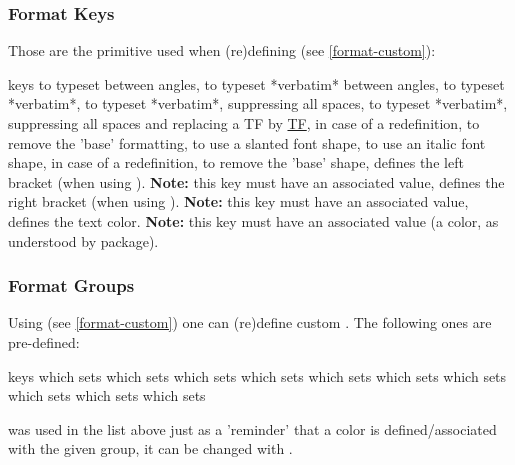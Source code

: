 \documentclass{article}
\begin{document}
\subsubsection{Format Keys}\label{format-keys}
Those are the primitive  used when (re)defining   (see \ref{format-custom}):
\begin{describelist*}{keys}
   {to typeset between angles,}
   {to typeset *verbatim* between angles,}
   {to typeset *verbatim*,}
   {to typeset *verbatim*, suppressing all spaces,}
   {to typeset *verbatim*, suppressing all spaces and replacing a TF by \underline{TF},}
   {in case of a redefinition, to remove the 'base' formatting,}
   {to use a slanted font shape,}
   {to use an italic font shape,}
   {in case of a redefinition, to remove the 'base' shape,}
    {defines the left bracket (when using \tsobj{\tsargs}). \textbf{Note:} this key must have an associated value,}
    {defines the right bracket (when using \tsobj{\tsargs}). \textbf{Note:} this key must have an associated value,}
     {defines the text color. \textbf{Note:} this key must have an associated value (a color, as understood by  package).}
\end{describelist*}


\subsubsection{Format Groups}\label{format-group}
Using  (see \ref{format-custom}) one can (re)define custom . The following ones are pre-defined:
\begin{describelist*}{keys}
   {which sets }
   {which sets }
   {which sets }
   {which sets }
   {which sets }
   {which sets }
   {which sets }
   {which sets }
    {which sets }
    {which sets }
\end{describelist*}
\begin{tsremark}
 was used in the list above just as a 'reminder' that a color is defined/associated with the given group, it can be changed with .
\end{tsremark}
\end{document}
